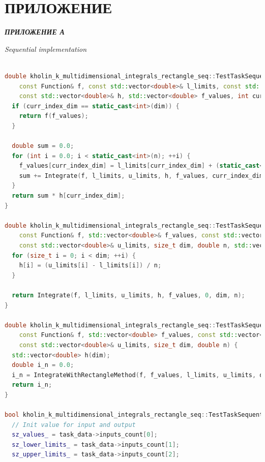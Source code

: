 \documentclass[14pt,a4paper]{article}
\begin{document}
\newpage

\section{ПРИЛОЖЕНИЕ}

{\raggedright\textit{\large\bfseries ПРИЛОЖЕНИЕ А}\par}

\textit{Sequential implementation}

\begin{framed}
\begin{lstlisting}[language=C++]

double kholin_k_multidimensional_integrals_rectangle_seq::TestTaskSequential::Integrate(
    const Function& f, const std::vector<double>& l_limits, const std::vector<double>& u_limits,
    const std::vector<double>& h, std::vector<double> f_values, int curr_index_dim, size_t dim, double n) {
  if (curr_index_dim == static_cast<int>(dim)) {
    return f(f_values);
  }

  double sum = 0.0;
  for (int i = 0.0; i < static_cast<int>(n); ++i) {
    f_values[curr_index_dim] = l_limits[curr_index_dim] + (static_cast<double>(i) + 0.5) * h[curr_index_dim];
    sum += Integrate(f, l_limits, u_limits, h, f_values, curr_index_dim + 1, dim, n);
  }
  return sum * h[curr_index_dim];
}

double kholin_k_multidimensional_integrals_rectangle_seq::TestTaskSequential::IntegrateWithRectangleMethod(
    const Function& f, std::vector<double>& f_values, const std::vector<double>& l_limits,
    const std::vector<double>& u_limits, size_t dim, double n, std::vector<double> h) {
  for (size_t i = 0; i < dim; ++i) {
    h[i] = (u_limits[i] - l_limits[i]) / n;
  }

  return Integrate(f, l_limits, u_limits, h, f_values, 0, dim, n);
}

double kholin_k_multidimensional_integrals_rectangle_seq::TestTaskSequential::RunMultistepSchemeMethodRectangle(
    const Function& f, std::vector<double> f_values, const std::vector<double>& l_limits,
    const std::vector<double>& u_limits, size_t dim, double n) {
  std::vector<double> h(dim);
  double i_n = 0.0;
  i_n = IntegrateWithRectangleMethod(f, f_values, l_limits, u_limits, dim, n, h);
  return i_n;
}

bool kholin_k_multidimensional_integrals_rectangle_seq::TestTaskSequential::PreProcessingImpl() {
  // Init value for input and output
  sz_values_ = task_data->inputs_count[0];
  sz_lower_limits_ = task_data->inputs_count[1];
  sz_upper_limits_ = task_data->inputs_count[2];


\end{lstlisting}
\end{framed}
\end{document}
